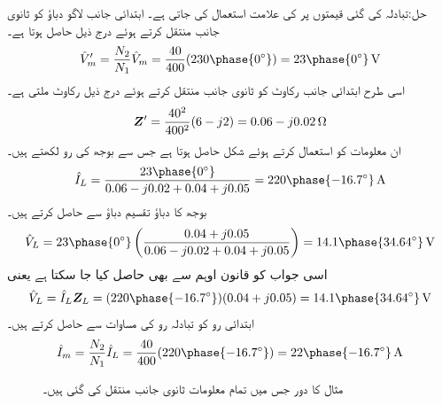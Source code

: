 حل:تبادلہ کی گئی قیمتوں پر  کی علامت استعمال کی جاتی ہے۔ ابتدائی جانب لاگو دباؤ کو ثانوی جانب منتقل کرتے ہوئے درج ذیل حاصل ہوتا ہے۔
\begin{align*}
\hat{V}_m'=\frac{N_2}{N_1} \hat{V}_m=\frac{40}{400} (230\phase{0^{\circ}})=23\phase{0^{\circ}}\,\si{\volt}
\end{align*}
اسی طرح ابتدائی جانب رکاوٹ کو ثانوی جانب منتقل کرتے ہوئے درج ذیل رکاوٹ ملتی ہے۔
\begin{align*}
{\ensuremath{{\boldsymbol{Z}}}}'=\frac{40^2}{400^2} (6-j2)=0.06-j0.02\,\si{\ohm}
\end{align*}
ان معلومات کو استعمال کرتے ہوئے شکل  حاصل ہوتا ہے جس سے  بوجھ کی رو لکھتے ہیں۔
\begin{align*}
\hat{I}_L=\frac{23\phase{0^{\circ}}}{0.06-j0.02+0.04+j0.05}=220\phase{-16.7^{\circ}}\,\si{\ampere}
\end{align*}
بوجھ کا دباؤ تقسیم دباؤ سے حاصل کرتے ہیں۔
\begin{align*}
\hat{V}_L=23\phase{0^{\circ}} \left(\frac{0.04+j0.05}{0.06-j0.02+0.04+j0.05}\right)=14.1\phase{34.64^{\circ}}\,\si{\volt}
\end{align*}
اسی جواب کو قانون اوہم سے بھی حاصل کیا جا سکتا ہے یعنی
\begin{align*}
\hat{V}_L=\hat{I}_L \bZ_L=(220\phase{-16.7^{\circ}})(0.04+j0.05)=14.1\phase{34.64^{\circ}}\,\si{\volt}
\end{align*}
ابتدائی رو کو تبادلہ رو کی مساوات سے حاصل کرتے ہیں۔
\begin{align*}
\hat{I}_m=\frac{N_2}{N_1} \hat{I}_L=\frac{40}{400} (220\phase{-16.7^{\circ}})=22\phase{-16.7^{\circ}}\,\si{\ampere}
\end{align*}
%
\begin{figure}
\centering
{}
\caption{مثال  کا دور جس میں تمام معلومات ثانوی جانب منتقل کی گئی ہیں۔}
\label{شکل_مقناطیسی_ثانوی_جانب_منتقلی}
\end{figure}

